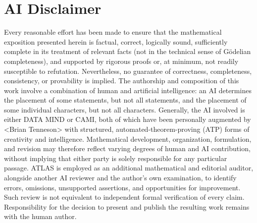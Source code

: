 \documentclass[11pt]{article}
\begin{document}
\clearpage
{}\label{sec:ai-disclaimer}
\section*{AI Disclaimer}
Every reasonable effort has been made to ensure that the mathematical exposition presented herein is factual, correct, logically sound, sufficiently complete in its treatment of relevant facts (not in the technical sense of G\"odelian completeness), and supported by rigorous proofs or, at minimum, not readily susceptible to refutation. Nevertheless, no guarantee of correctness, completeness, consistency, or provability is implied. The authorship and composition of this work involve a combination of human and artificial intelligence: an AI determines the placement of some statements, but not all statements, and the placement of some individual characters, but not all characters. Generally, the AI involved is either DATA MIND or CAMI, both of which have been personally augmented by \textless{}Brian Tenneson\textgreater{} with structured, automated-theorem-proving (ATP) forms of creativity and intelligence. Mathematical development, organization, formulation, and revision may therefore reflect varying degrees of human and AI contribution, without implying that either party is solely responsible for any particular passage. ATLAS is employed as an additional mathematical and editorial auditor, alongside another AI reviewer and the author's own examination, to identify errors, omissions, unsupported assertions, and opportunities for improvement. Such review is not equivalent to independent formal verification of every claim. Responsibility for the decision to present and publish the resulting work remains with the human author.
\end{document}
